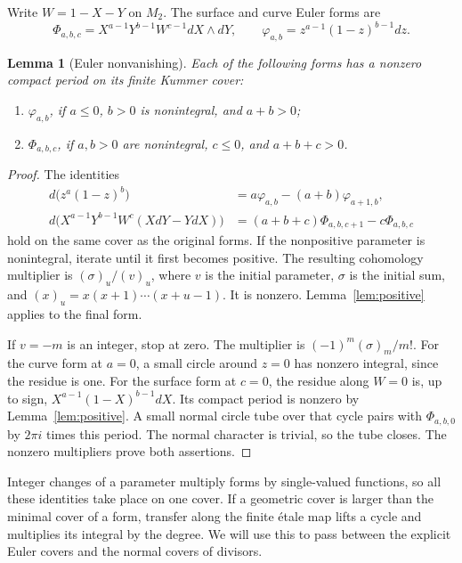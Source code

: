 \documentclass[11pt]{article}
\numberwithin{equation}{section}
\newtheorem{lemma}[theorem]{Lemma}
\theoremstyle{definition}
\theoremstyle{remark}
\begin{document}
Write $W=1-X-Y$ on $M_2$. The surface and curve Euler forms are
\begin{equation}\label{eq:euler-forms}
 \Phi_{a,b,c}=X^{a-1}Y^{b-1}W^{c-1}dX\wedge dY,
 \qquad
 \varphi_{a,b}=z^{a-1}(1-z)^{b-1}dz.
\end{equation}

\begin{lemma}[Euler nonvanishing]\label{lem:euler}
Each of the following forms has a nonzero compact period
on its finite Kummer cover:
\begin{enumerate}[label=\textup{(\roman*)},leftmargin=*]
\item $\varphi_{a,b}$, if $a\le0$, $b>0$ is nonintegral,
      and $a+b>0$;
\item $\Phi_{a,b,c}$, if $a,b>0$ are nonintegral, $c\le0$,
      and $a+b+c>0$.
\end{enumerate}
\end{lemma}

\begin{proof}
The identities
\begin{align}
 d\bigl(z^a(1-z)^b\bigr)
   &=a\varphi_{a,b}-(a+b)\varphi_{a+1,b},
       \label{eq:curve-contiguity}\\
 d\bigl(X^{a-1}Y^{b-1}W^c(XdY-YdX)\bigr)
   &=(a+b+c)\Phi_{a,b,c+1}-c\Phi_{a,b,c}
       \label{eq:surface-contiguity}
\end{align}
hold on the same cover as the original forms. If the
nonpositive parameter is nonintegral, iterate until it first
becomes positive. The resulting cohomology multiplier is
$(\sigma)_u/(v)_u$, where $v$ is the initial parameter,
$\sigma$ is the initial sum, and $(x)_u=x(x+1)\cdots(x+u-1)$.
It is nonzero. Lemma~\ref{lem:positive} applies to the final
form.

If $v=-m$ is an integer, stop at zero. The multiplier
is $(-1)^m(\sigma)_m/m!$. For the curve form at $a=0$, a
small circle around $z=0$ has nonzero integral, since the
residue is one. For the surface form at $c=0$, the residue
along $W=0$ is, up to sign,
$X^{a-1}(1-X)^{b-1}dX$. Its compact period is nonzero by
Lemma~\ref{lem:positive}. A small normal circle tube over
that cycle pairs with $\Phi_{a,b,0}$ by $2\pi i$ times this
period. The normal character is trivial, so the tube closes.
The nonzero multipliers prove both assertions.
\end{proof}

Integer changes of a parameter multiply forms by
single-valued functions, so all these identities take place
on one cover. If a geometric cover is larger than the
minimal cover of a form, transfer along the finite \'etale
map lifts a cycle and multiplies its integral by the degree.
We will use this to pass between the explicit Euler covers
and the normal covers of divisors.
\end{document}
